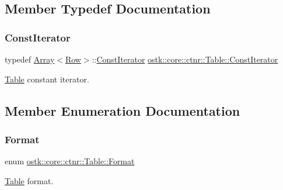 \subsection{Member Typedef Documentation}
\mbox{\label{classostk_1_1core_1_1ctnr_1_1_table_a44e6a375120737f0675ea6689022050f}} 
\subsubsection{\texorpdfstring{Const\+Iterator}{ConstIterator}}
{\footnotesize\ttfamily typedef \hyperlink{classostk_1_1core_1_1ctnr_1_1_array}{Array}$<$\hyperlink{classostk_1_1core_1_1ctnr_1_1table_1_1_row}{Row}$>$\+::\hyperlink{classostk_1_1core_1_1ctnr_1_1_table_a44e6a375120737f0675ea6689022050f}{Const\+Iterator} \hyperlink{classostk_1_1core_1_1ctnr_1_1_table_a44e6a375120737f0675ea6689022050f}{ostk\+::core\+::ctnr\+::\+Table\+::\+Const\+Iterator}}



\hyperlink{classostk_1_1core_1_1ctnr_1_1_table}{Table} constant iterator. 



\subsection{Member Enumeration Documentation}
\mbox{\label{classostk_1_1core_1_1ctnr_1_1_table_aacb867db63d74cac28a388029bf161d2}} 
\subsubsection{\texorpdfstring{Format}{Format}}
{\footnotesize\ttfamily enum \hyperlink{classostk_1_1core_1_1ctnr_1_1_table_aacb867db63d74cac28a388029bf161d2}{ostk\+::core\+::ctnr\+::\+Table\+::\+Format}\hspace{0.3cm}{\ttfamily [strong]}}



\hyperlink{classostk_1_1core_1_1ctnr_1_1_table}{Table} format. 

